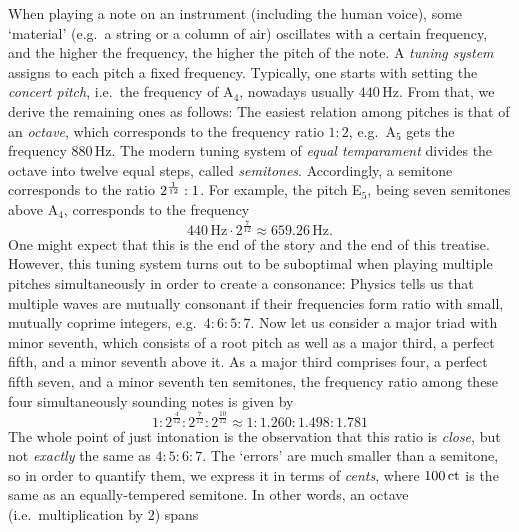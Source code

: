 \documentclass[british,11pt]{scrartcl}
\begin{document}
When playing a note on an instrument (including the human voice), some
‘material’ (e.g.\ a string or a column of air) oscillates with a certain
frequency, and the higher the frequency, the higher the pitch of the note.  A
\emph{tuning system} assigns to each pitch a fixed frequency.  Typically, one
starts with setting the \emph{concert pitch}, i.e.\ the frequency of
A$_4$, nowadays usually $440$\,Hz.  From that, we derive the remaining
ones as follows: The easiest relation among pitches is that of an \emph{octave},
which corresponds to the frequency ratio $1:2$, e.g.\ A$_5$ gets the
frequency $880$\,Hz.  The modern tuning system of \emph{equal temparament}
divides the octave into twelve equal steps, called
\emph{semitones}. Accordingly, a semitone corresponds to the ratio
$2^{\smash{\frac1{12}}}:1$. For example, the pitch E$_5$, being seven
semitones above A$_4$, corresponds to the frequency
\[440\,\text{Hz}\cdot 2^{\frac7{12}} \approx 659.26\,\text{Hz}.\] One might
expect that this is the end of the story and the end of this treatise.  However,
this tuning system turns out to be suboptimal when playing multiple pitches
simultaneously in order to create a consonance: Physics tells us that multiple
waves are mutually consonant if their frequencies form ratio with small, mutually
coprime integers, e.g.\ $4:6:5:7$.
Now let us consider a major triad with minor seventh, which consists of a root pitch
as well as a major third, a perfect fifth, and a minor seventh above it. As a major
third comprises four, a perfect fifth seven, and a minor seventh ten semitones, the
frequency ratio among these four simultaneously sounding notes is given by
\[1:2^{\frac4{12}}:2^{\frac7{12}}:2^{\frac{10}{12}}\approx
  1:1.260:1.498:1.781\]%
The whole point of just intonation is the observation that this ratio is
\emph{close}, but not \emph{exactly} the same as $4:5:6:7$. The ‘errors’ are
much smaller than a semitone, so in order to quantify them, we express it in
terms of \emph{cents}, where $100\,\mathrm{ct}$ is the same as an equally-tempered
semitone.  In other words, an octave (i.e.\ multiplication by $2$) spans
\end{document}
